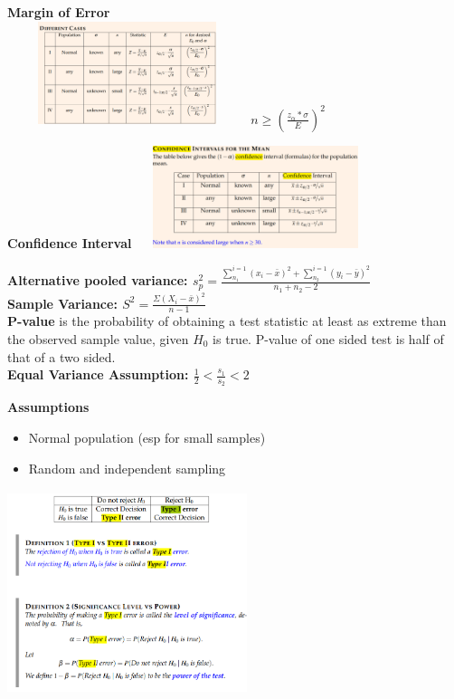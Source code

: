 \documentclass[10pt, landscape]{article}
\begin{document}
\begin{multicols}{4}


\textbf{Margin of Error}\\
\includegraphics[width=7cm, height=3cm]{moe.png}
\textbf{$n \ge (\frac{z_{\alpha}*\sigma}{E})^2$}

\textbf{Confidence Interval}
\includegraphics[width=7cm, height=3cm]{ci.png}

\textbf{Alternative pooled variance: $s^2_p = \frac{\sum_{n_1}^{i=1}(x_i-\bar{x})^2 + \sum_{n_2}^{i=1}(y_i-\bar{y})^2}{n_1+n_2-2}$} \\ 

\textbf{Sample Variance: $S^2=\frac{\Sigma(X_i-\bar{x})^2}{n-1}$} \\


\textbf{P-value} is the probability of obtaining a test statistic at least as extreme than the observed sample value, given $H_0$ is true. P-value of one sided test is half of that of a two sided.\\


\textbf{Equal Variance Assumption: $\frac{1}{2} < \frac{s_1}{s_2} < 2$}

\textbf{Assumptions} \\
\begin{itemize}
  \item Normal population (esp for small samples)
  \item Random and independent sampling
\end{itemize}

\includegraphics[width=7cm, height=6cm]{errors.png}


\end{multicols}
\end{document}
